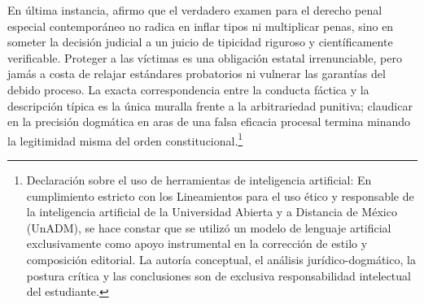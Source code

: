 \documentclass[spanish,letterpaper,oneside]{article}
\begin{document}
En \'ultima instancia, afirmo que el verdadero examen para el derecho penal especial contempor\'aneo no radica en inflar tipos ni multiplicar penas, sino en someter la decisi\'on judicial a un juicio de tipicidad riguroso y cient\'ificamente verificable. Proteger a las v\'ictimas es una obligaci\'on estatal irrenunciable, pero jam\'as a costa de relajar est\'andares probatorios ni vulnerar las garant\'ias del debido proceso. La exacta correspondencia entre la conducta f\'actica y la descripci\'on t\'ipica es la \'unica muralla frente a la arbitrariedad punitiva; claudicar en la precisi\'on dogm\'atica en aras de una falsa eficacia procesal termina minando la legitimidad misma del orden constitucional.\footnote{Declaraci\'on sobre el uso de herramientas de inteligencia artificial: En cumplimiento estricto con los Lineamientos para el uso \'etico y responsable de la inteligencia artificial de la Universidad Abierta y a Distancia de M\'exico (UnADM), se hace constar que se utiliz\'o un modelo de lenguaje artificial exclusivamente como apoyo instrumental en la correcci\'on de estilo y composici\'on editorial. La autor\'ia conceptual, el an\'alisis jur\'idico-dogm\'atico, la postura cr\'itica y las conclusiones son de exclusiva responsabilidad intelectual del estudiante.}
\end{document}
